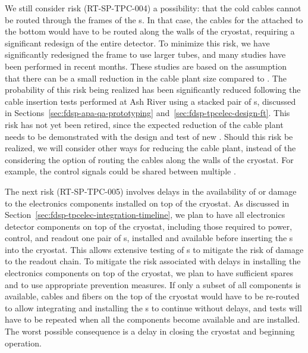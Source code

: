 We still consider risk (RT-SP-TPC-004) a possibility: that the cold cables cannot
be routed through the frames of the s. In that case, the cables for the
 attached to the bottom  would have to be routed along the
walls of the cryostat, requiring a significant redesign of the entire detector. 
To minimize this risk, we have significantly redesigned the  frame 
to use larger tubes, and many studies have been performed in recent months.
These studies are based on the assumption that there can be a small reduction in
the cable plant size compared to . The probability of this risk
being realized has been significantly reduced following the cable insertion
tests performed at Ash River using a stacked pair of s, discussed
in Sections~\ref{sec:fdsp-apa-qa-prototyping} and~\ref{sec:fdsp-tpcelec-design-ft}.
This risk has not yet been retired, since the expected reduction of the cable plant 
needs to be demonstrated with the design and test of new . Should
this risk be realized, we will consider other ways for reducing the cable 
plant, instead of the considering the option of routing the cables along the 
walls of the cryostat. For example, the control signals could be shared between 
multiple .

The next risk (RT-SP-TPC-005) involves delays in the availability of or
damage to the  electronics components installed on top of the
cryostat. As discussed in Section~\ref{sec:fdsp-tpcelec-integration-timeline},
we plan to have all  electronics detector components on top of the cryostat, including those 
required to power, control, and readout one pair of s, installed
and available before inserting the s into the cryostat.
This allows extensive testing of s to mitigate
the risk of damage to the readout chain. To mitigate the risk associated with
delays in installing the  electronics components on top of the cryostat,
we plan to have sufficient spares and to use appropriate  
prevention measures. If only a subset of all components is available, cables 
and fibers on the top of the cryostat would have to be re-routed to allow  
integrating and installing the s to continue without delays, 
and tests will have to be repeated when all the components become available 
and are installed. The worst possible consequence is a delay in closing 
the cryostat and beginning operation. 

